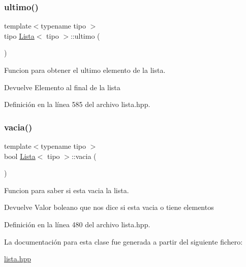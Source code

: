 \subsubsection{\texorpdfstring{ultimo()}{ultimo()}}
{\footnotesize\ttfamily template$<$typename tipo $>$ \\
tipo \hyperlink{classLista}{Lista}$<$ tipo $>$\+::ultimo (\begin{DoxyParamCaption}{ }\end{DoxyParamCaption})}



Funcion para obtener el ultimo elemento de la lista. 

\begin{DoxyReturn}{Devuelve}
Elemento al final de la lista 
\end{DoxyReturn}


Definición en la línea 585 del archivo lista.\+hpp.

\mbox{\label{classLista_a92650be08dd29c9800da07c65ad6ff3a}} 
\subsubsection{\texorpdfstring{vacia()}{vacia()}}
{\footnotesize\ttfamily template$<$typename tipo $>$ \\
bool \hyperlink{classLista}{Lista}$<$ tipo $>$\+::vacia (\begin{DoxyParamCaption}{ }\end{DoxyParamCaption})}



Funcion para saber si esta vacia la lista. 

\begin{DoxyReturn}{Devuelve}
Valor boleano que nos dice si esta vacia o tiene elementos 
\end{DoxyReturn}


Definición en la línea 480 del archivo lista.\+hpp.



La documentación para esta clase fue generada a partir del siguiente fichero\+:\begin{DoxyCompactItemize}
\item 
\hyperlink{lista_8hpp}{lista.\+hpp}\end{DoxyCompactItemize}
